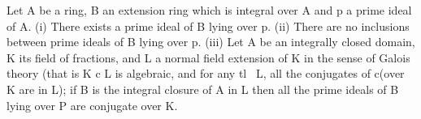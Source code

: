 \begin{theorem}[Theorem 9.3]\label{mcrt-auto-theorem-9-3}\uses{}
\begin{mathematicalrecord}
Let A be a ring, B an extension ring which is integral over
A and p a prime ideal of A.
   (i) There exists a prime ideal of B lying over p.
   (ii) There are no inclusions between prime ideals of B lying over p.
   (iii) Let A be an integrally closed domain, K its field of fractions, and L a
normal field extension of K in the sense of Galois theory (that is K c L is
algebraic, and for any tl~ L, all the conjugates of c(over K are in L); if B is the
integral closure of A in L then all the prime ideals of B lying over P
are conjugate over K.
\end{mathematicalrecord}
\end{theorem}
